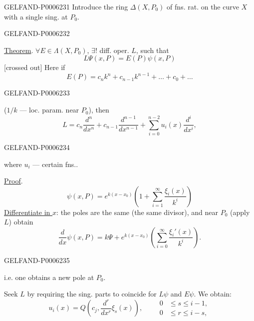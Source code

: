 \begin{GelfandAdjacentEvidence}{GELFAND-P000623}{1}
Introduce the ring \(\Delta(X,P_0)\) of fns. rat. on the curve \(X\) with a single sing. at \(P_0\).
\end{GelfandAdjacentEvidence}
\begin{GelfandAdjacentEvidence}{GELFAND-P000623}{2}


\underline{Theorem}. \(\forall E\in\Lambda(X,P_0)\), \(\exists!\) diff. oper. \(L\), such that
\[
L\Psi(x,P)=E(P)\psi(x,P)
\]
[crossed out] Here if
\[
E(P)=c_n k^n+c_{n-1}k^{n-1}+\ldots+c_0+\ldots
\]
\end{GelfandAdjacentEvidence}
\begin{GelfandAdjacentEvidence}{GELFAND-P000623}{3}

(\(1/k\) — loc. param. near \(P_0\)), then
\[
L=c_n\frac{d^n}{dx^n}+c_{n-1}\frac{d^{n-1}}{dx^{n-1}}+
\sum_{i=0}^{n-2}u_i(x)\frac{d^i}{dx^i},
\]
\end{GelfandAdjacentEvidence}
\begin{GelfandAdjacentEvidence}{GELFAND-P000623}{4}

where \(u_i\) — certain fns..

\underline{Proof}.
\[
\psi(x,P)=e^{k(x-x_0)}\left(1+\sum_{i=1}^\infty\frac{\xi_i(x)}{k^i}\right)
\]
\underline{Differentiate in \(x\)}:
the poles are the same (the same divisor), and near \(P_0\) (apply \(L\)) obtain
\[
\frac{d}{dx}\psi(x,P)=k\Psi+e^{k(x-x_0)}
\left(\sum_{i=0}^\infty\frac{\xi_i'(x)}{k^i}\right).
\]
\end{GelfandAdjacentEvidence}
\begin{GelfandAdjacentEvidence}{GELFAND-P000623}{5}

i.e. one obtains a new pole at \(P_0\).

Seek \(L\) by requiring the sing. parts to coincide for \(L\psi\) and \(E\psi\).
We obtain:
\[
u_i(x)=Q\left(c_j,\frac{d^r}{dx^r}\xi_s(x)\right),\qquad
\begin{aligned}
0&\le s\le i-1,\\
0&\le r\le i-s,
\end{aligned}
\]
\end{GelfandAdjacentEvidence}
